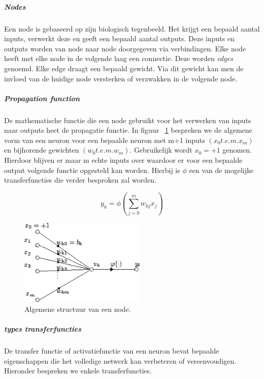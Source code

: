 			\subparagraph{Nodes}
			Een node is gebaseerd op zijn biologisch tegenbeeld. Het krijgt een bepaald aantal inputs, verwerkt deze en geeft een bepaald aantal outputs. Deze inputs en outputs worden van node naar node doorgegeven via verbindingen. Elke node heeft met elke node in de volgende laag een connectie. Deze worden \textit{edges} genoemd. Elke edge draagt een bepaald gewicht. Via dit gewicht kan men de invloed van de  huidige node versterken of verzwakken in de volgende node.
	
			\subparagraph{Propagation function}
			De mathematische functie die een node gebruikt voor het verwerken van inputs naar outputs heet de propagatie functie.
			In figuur ~\ref{fig:artificial_neuron} bespreken we de algemene vorm van een neuron voor een bepaalde neuron met m+1 inputs $\left(  x_0 t.e.m. x_m \right) $ en bijhorende gewichten $\left(  w_0 t.e.m. w_m \right) $.
			Gebruikelijk wordt $x_0 = +1$ genomen. Hierdoor blijven er maar m echte inputs over waardoor er voor een bepaalde output volgende functie opgesteld kan worden. Hierbij is $\phi$ een van de mogelijke transferfuncties die verder besproken zal worden.

			\begin{equation}
				y_k = \phi \left( \sum_{j=0}^{m}w_{kj}x_j\right) 
			\end{equation}
			
			\begin{figure}
				\centering
				\includegraphics[width=60mm]{afbeeldingen/Artificial_neuron.PNG}
				\caption{Algemene structuur van een node.}
				\label{fig:artificial_neuron}
			\end{figure}
			
			\subparagraph{types transferfuncties}
			De transfer functie of activatiefunctie van een neuron bevat bepaalde eigenschappen die het volledige netwerk kan verbeteren of vereenvoudigen. Hieronder bespreken we enkele transferfuncties.
			
